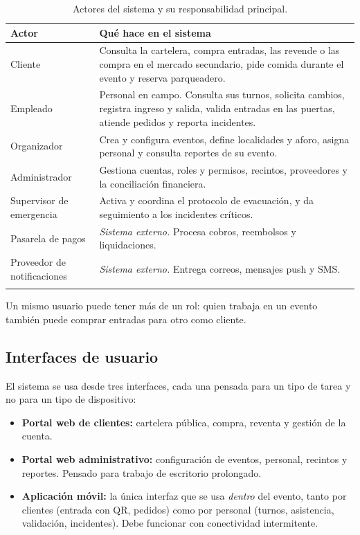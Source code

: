\documentclass[11pt,a4paper]{article}
\begin{document}
\begin{center}
\begin{longtable}{P{3.2cm}P{11.3cm}}
\toprule
\textbf{Actor} & \textbf{Qué hace en el sistema}\\
\midrule
\endhead
Cliente & Consulta la cartelera, compra entradas, las revende o las compra en el mercado
secundario, pide comida durante el evento y reserva parqueadero.\\[0.3em]
Empleado & Personal en campo. Consulta sus turnos, solicita cambios, registra ingreso y salida,
valida entradas en las puertas, atiende pedidos y reporta incidentes.\\[0.3em]
Organizador & Crea y configura eventos, define localidades y aforo, asigna personal y consulta
reportes de su evento.\\[0.3em]
Administrador & Gestiona cuentas, roles y permisos, recintos, proveedores y la conciliación
financiera.\\[0.3em]
Supervisor de emergencia & Activa y coordina el protocolo de evacuación, y da seguimiento a los
incidentes críticos.\\[0.3em]
Pasarela de pagos & \textit{Sistema externo.} Procesa cobros, reembolsos y liquidaciones.\\[0.3em]
Proveedor de notificaciones & \textit{Sistema externo.} Entrega correos, mensajes push y SMS.\\
\bottomrule
\caption{Actores del sistema y su responsabilidad principal.}
\label{tab:actores}
\end{longtable}
\end{center}

Un mismo usuario puede tener más de un rol: quien trabaja en un evento también puede comprar
entradas para otro como cliente.

\subsection{Interfaces de usuario}

El sistema se usa desde tres interfaces, cada una pensada para un tipo de tarea y no para un tipo
de dispositivo:

\begin{itemize}
  \item \textbf{Portal web de clientes:} cartelera pública, compra, reventa y gestión de la cuenta.
  \item \textbf{Portal web administrativo:} configuración de eventos, personal, recintos y
        reportes. Pensado para trabajo de escritorio prolongado.
  \item \textbf{Aplicación móvil:} la única interfaz que se usa \textit{dentro} del evento, tanto
        por clientes (entrada con QR, pedidos) como por personal (turnos, asistencia, validación,
        incidentes). Debe funcionar con conectividad intermitente.
\end{itemize}
\end{document}
